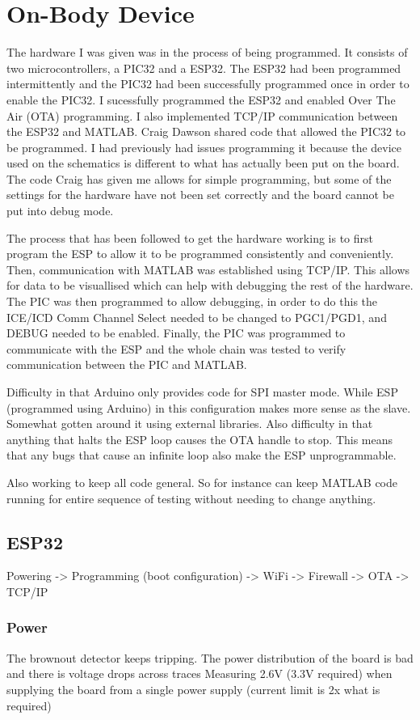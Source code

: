 \chapter{On-Body Device}
The hardware I was given was in the process of being programmed.
It consists of two microcontrollers, a PIC32 and a ESP32.
The ESP32 had been programmed intermittently
and the PIC32 had been successfully programmed once in order to enable the PIC32.
I sucessfully programmed the ESP32 and enabled Over The Air (OTA) programming.
I also implemented TCP/IP communication between the ESP32 and MATLAB.
Craig Dawson shared code that allowed the PIC32 to be programmed.
I had previously had issues programming it
because the device used on the schematics is different
to what has actually been put on the board.
The code Craig has given me allows for simple programming,
but some of the settings for the hardware have not been set correctly
and the board cannot be put into debug mode.

The process that has been followed to get the hardware working
is to first program the ESP to allow it to be programmed consistently and conveniently.
Then, communication with MATLAB was established using TCP/IP.
This allows for data to be visuallised
which can help with debugging the rest of the hardware.
The PIC was then programmed to allow debugging,
in order to do this the ICE/ICD Comm Channel Select needed to be changed to PGC1/PGD1,
and DEBUG needed to be enabled.
Finally, the PIC was programmed to communicate with the ESP
and the whole chain was tested to verify communication between the PIC and MATLAB.

Difficulty in that Arduino only provides code for SPI master mode.
While ESP (programmed using Arduino) in this configuration makes more sense as the slave.
Somewhat gotten around it using external libraries.
Also difficulty in that anything that halts the ESP loop causes the OTA handle to stop.
This means that any bugs that cause an infinite loop also make the ESP unprogrammable.

Also working to keep all code general.
So for instance can keep MATLAB code running
for entire sequence of testing without needing to change anything.

\section{ESP32}
Powering -> Programming (boot configuration) -> WiFi -> Firewall -> OTA -> TCP/IP

\subsection{Power}
The brownout detector keeps tripping.
The power distribution of the board is bad and there is voltage drops across traces
Measuring 2.6V (3.3V required) when supplying the board from a single power supply
(current limit is 2x what is required)

